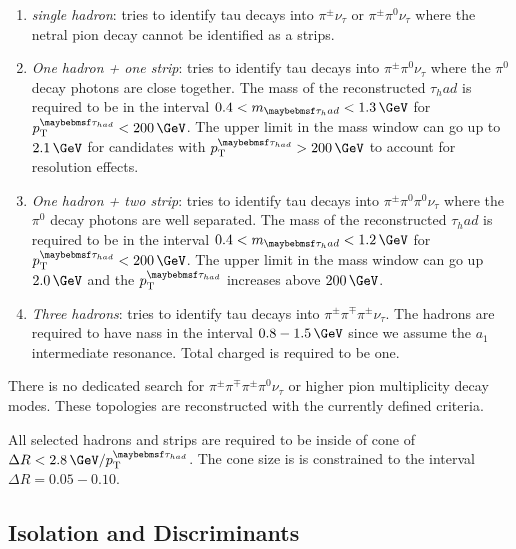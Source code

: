 \begin{enumerate}
  \item \textit{single hadron}: tries to identify tau decays into $\pi^{\pm} \nu_\tau$ or $\pi^{\pm} \pi^{0} \nu_\tau$ where the netral pion decay cannot be identified as a strips.
  \item \textit{One hadron + one strip}: tries to identify tau decays into $\pi^{\pm} \pi^{0} \nu_\tau$ where the $\pi^{0}$ decay photons are close together. The mass of the reconstructed $\tau_had$ is required to be in the interval $0.4<m_{\tau_had}<1.3\,\GeV$ for $\pt^{\tau_{had}} < 200\,\GeV$. The upper limit in the mass window can go up to $2.1\,\GeV$ for candidates with $\pt^{\tau_{had}} > 200\,\GeV$ to account for resolution effects.
  \item \textit{One hadron + two strip}: tries to identify tau decays into $\pi^{\pm} \pi^{0} \pi^{0} \nu_\tau$ where the $\pi^{0}$ decay photons are well separated. The mass of the reconstructed $\tau_had$ is required to be in the interval $0.4<m_{\tau_had}<1.2\,\GeV$ for $\pt^{\tau_{had}} < 200\,\GeV$. The upper limit in the mass window can go up $2.0\,\GeV$ and the $\pt^{\tau_{had}}$ increases above $200\,\GeV$.
  \item \textit{Three hadrons}: tries to identify tau decays into $\pi^{\pm} \pi^{\mp} \pi^{\pm} \nu_\tau$. The hadrons are required to have nass in the interval $0.8-1.5\,\GeV$ since we assume the $a_{1}$ intermediate resonance. Total charged is required to be one.
\end{enumerate}

There is no dedicated search for $\pi^{\pm} \pi^{\mp} \pi^{\pm} \pi^{0} \nu_\tau$ or higher pion multiplicity decay modes. These topologies are reconstructed with the currently defined criteria.

All selected hadrons and strips are required to be inside of cone of $\Delta R < 2.8\,\GeV/\pt^{\tau_{had}}$. The cone size is is constrained to the interval $\Delta R=0.05-0.10$. 

\subsection{Isolation and Discriminants}
\label{SECTION:EventReconstructionAndSimulation_Taus_IsolationAndDiscriminants}


